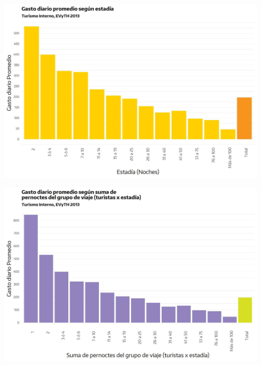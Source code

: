 \documentclass[
]{book}
\begin{document}
\begin{center}\includegraphics[width=1\linewidth,height=1\textheight]{imagenes/DT4_grafico18_b} \end{center}

\begin{center}\includegraphics[width=1\linewidth,height=1\textheight]{imagenes/DT4_grafico18_c} \end{center}
\end{document}
